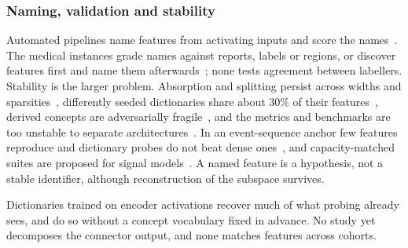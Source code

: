 \subsubsection{Naming, validation and stability}

Automated pipelines name features from activating inputs and score the
names~\cite{paulo2024automatically}. The medical instances grade names against reports, labels or
regions, or discover features first and name them
afterwards~\cite{bouzid2025insights,abdulaal2024an,haque2026medconcept,nakka2025mammosae,rao2024discover};
none tests agreement between labellers. Stability is the larger problem. Absorption and splitting persist
across widths and sparsities~\cite{chanin2024a}, differently seeded dictionaries share about 30\% of
their features~\cite{paulo2025sparse}, derived concepts are adversarially fragile~\cite{li2025evaluating},
and the metrics and benchmarks are too unstable to separate
architectures~\cite{chanin2026are,chanin2026synthsaebench}. In an event-sequence anchor few features
reproduce and dictionary probes do not beat dense ones~\cite{sainsbury2026sparse}, and capacity-matched
suites are proposed for signal models~\cite{duan2026ecginterpbench}. A named feature is a hypothesis, not
a stable identifier, although reconstruction of the subspace survives.

Dictionaries trained on encoder activations recover much of what probing already sees, and do so
without a concept vocabulary fixed in advance. No study yet decomposes the connector output, and none
matches features across cohorts.
